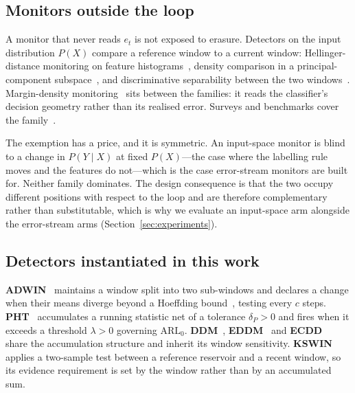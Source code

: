 \subsection{Monitors outside the loop}
A monitor that never reads $e_t$ is not exposed to erasure. Detectors on the
input distribution $P(X)$ compare a reference window to a current window:
Hellinger-distance monitoring on feature histograms~\cite{ditzler_hdddm_2011},
density comparison in a principal-component
subspace~\cite{qahtan_pcacd_2015}, and discriminative separability between the
two windows~\cite{gozuacik_d3_2019}. Margin-density
monitoring~\cite{sethi_md3_2017} sits between the families: it reads the
classifier's decision geometry rather than its realised error. Surveys and
benchmarks cover the family~\cite{gemaque_2020, hu_nofreelunch_2020,
lukats_2025}.

The exemption has a price, and it is symmetric. An input-space monitor is blind
to a change in $P(Y \mid X)$ at fixed $P(X)$---the case where the labelling rule
moves and the features do not---which is the case error-stream monitors are
built for. Neither family dominates. The design consequence is that the two
occupy different positions with respect to the loop and are therefore
complementary rather than substitutable, which is why we evaluate an
input-space arm alongside the error-stream arms
(Section~\ref{sec:experiments}).

\subsection{Detectors instantiated in this work}
\textbf{ADWIN}~\cite{bifet_adwin_2007} maintains a window split into two
sub-windows and declares a change when their means diverge beyond a Hoeffding
bound~\cite{hoeffding_1963}, testing every $c$ steps.
\textbf{PHT}~\cite{page_1954, basseville_1993} accumulates a running statistic
net of a tolerance $\delta_P>0$ and fires when it exceeds a threshold $\lambda>0$
governing $\mathrm{ARL}_0$. \textbf{DDM}~\cite{gama_ddm_2004},
\textbf{EDDM}~\cite{baena_eddm_2006} and \textbf{ECDD}~\cite{ross_ecdd_2012}
share the accumulation structure and inherit its window sensitivity.
\textbf{KSWIN}~\cite{raab_kswin_2020} applies a two-sample test between a
reference reservoir and a recent window, so its evidence requirement is set by
the window rather than by an accumulated sum.